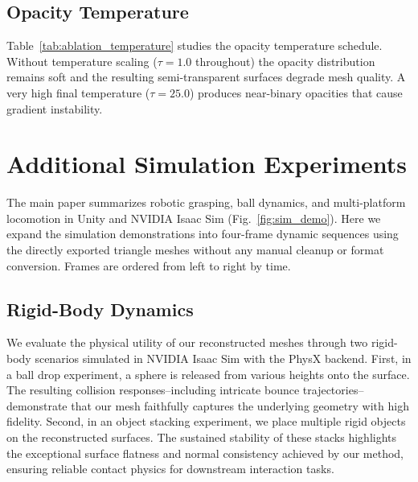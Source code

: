 \subsection{Opacity Temperature}
\label{sec:app_ablation_temperature}

Table~\ref{tab:ablation_temperature} studies the opacity temperature schedule. Without temperature scaling ($\tau = 1.0$ throughout) the opacity distribution remains soft and the resulting semi-transparent surfaces degrade mesh quality. A very high final temperature ($\tau = 25.0$) produces near-binary opacities that cause gradient instability.

\begin{table}[h]
\centering
\caption{\textbf{Ablation on opacity temperature} (RE10K, 6 views).}
\label{tab:ablation_temperature}
\end{table}

\section{Additional Simulation Experiments}
\label{sec:app_simulation}

The main paper summarizes robotic grasping, ball dynamics, and multi-platform locomotion in Unity and NVIDIA Isaac Sim (Fig.~\ref{fig:sim_demo}). Here we expand the simulation demonstrations into four-frame dynamic sequences using the directly exported triangle meshes without any manual cleanup or format conversion. Frames are ordered from left to right by time.

\subsection{Rigid-Body Dynamics}
\label{sec:app_rigid_body}
We evaluate the physical utility of our reconstructed meshes through two rigid-body scenarios simulated in NVIDIA Isaac Sim with the PhysX backend. First, in a ball drop experiment, a sphere is released from various heights onto the surface. The resulting collision responses--including intricate bounce trajectories--demonstrate that our mesh faithfully captures the underlying geometry with high fidelity. Second, in an object stacking experiment, we place multiple rigid objects on the reconstructed surfaces. The sustained stability of these stacks highlights the exceptional surface flatness and normal consistency achieved by our method, ensuring reliable contact physics for downstream interaction tasks.

